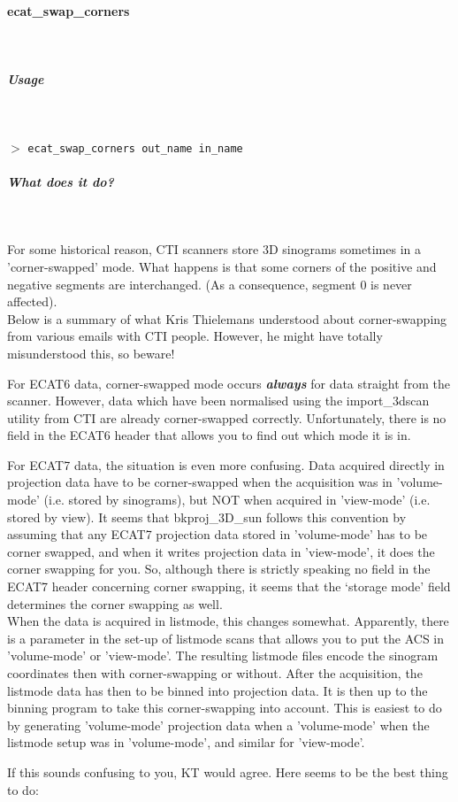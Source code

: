\documentclass{article}
\newcommand{\subsubsubsection}[1]{\paragraph{#1}\mbox{} \\}
\newcommand{\subsubsubsubsection}[1]{\subparagraph{#1} \mbox{} \\}
\newcommand{\cmdline}[1]{\par \noindent $>$ \texttt{#1}\par}
\begin{document}
{\subsubsubsection{ecat\_swap\_corners}
\label{sec:ecat_swap_corners}
{ \subsubsubsubsection{Usage}
}
\cmdline{ecat\_swap\_corners out\_name in\_name}

{ \subsubsubsubsection{What does it do?}
}
For some historical reason, CTI scanners store 3D sinograms sometimes 
in a 'corner-swapped' mode. What happens is that some corners 
of the positive and negative segments are interchanged. (As a 
consequence, segment 0 is never affected).\\
Below is a summary of what Kris Thielemans understood about corner-swapping 
from various emails with CTI people. However, he might have totally 
misunderstood this, so beware!



For ECAT6 data, corner-swapped mode occurs \textbf{\textit{always}} for 
data straight from the scanner. However, data which have been 
normalised using the import\_3dscan utility from CTI are already 
corner-swapped correctly. Unfortunately, there is no field in 
the ECAT6 header that allows you to find out which mode it is 
in.



For ECAT7 data, the situation is even more confusing. Data acquired 
directly in projection data have to be corner-swapped when the 
acquisition was in 'volume-mode' (i.e. stored by sinograms), 
but NOT when acquired in 'view-mode' (i.e. stored by view). It 
seems that bkproj\_3D\_sun follows this convention by assuming 
that any ECAT7 projection data stored in 'volume-mode' has to 
be corner swapped, and when it writes projection data in 'view-mode', 
it does the corner swapping for you. So, although there is strictly 
speaking no field in the ECAT7 header concerning corner swapping, 
it seems that the `storage mode' field determines the corner swapping 
as well.\\
When the data is acquired in listmode, this changes somewhat. 
Apparently, there is a parameter in the set-up of listmode scans 
that allows you to put the ACS in 'volume-mode' or 'view-mode'. 
The resulting listmode files encode the sinogram coordinates 
then with corner-swapping or without. After the acquisition, 
the listmode data has then to be binned into projection data. 
It is then up to the binning program to take this corner-swapping 
into account. This is easiest to do by generating 'volume-mode' 
projection data when a 'volume-mode' when the listmode setup 
was in 'volume-mode', and similar for 'view-mode'.


If this sounds confusing to you, KT would agree. Here seems to 
be the best thing to do:


}
\end{document}
